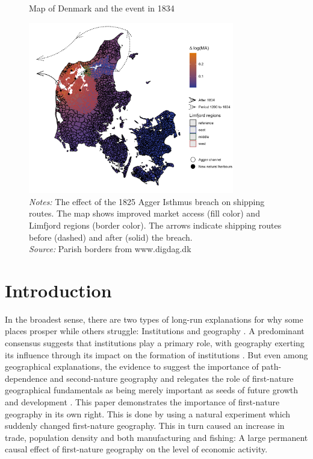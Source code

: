 \documentclass[11pt]{article}
\begin{document}
\begin{figure}[h]
\centering
\caption{Map of Denmark and the event in 1834}
\includegraphics[width=0.8\textwidth]{Plots/Map_manual_edits.png}
\parbox{0.9\textwidth}{
\caption*{\footnotesize \textit{Notes:} The effect of the 1825 Agger Isthmus breach on shipping routes. The map shows improved market access (fill color) and Limfjord regions (border color). The arrows indicate shipping routes before (dashed) and after (solid) the breach. \\ \textit{Source:} Parish borders from www.digdag.dk}
}
\label{fig:main_map}
\end{figure}

\section{Introduction}
In the broadest sense, there are two types of long-run explanations for why some places prosper while others struggle: Institutions \citep{rodrik2004institutions} and geography \citep{Henderson2018satelite}. A predominant consensus suggests that institutions play a primary role, with geography exerting its influence through its impact on the formation of institutions \citep{Acemoglu2001, rodrik2004institutions, Easterly2003, Ketterer2018}. But even among geographical explanations, the evidence to suggest the importance of path-dependence and second-nature geography \citep{Krugman1991, Bleakley2012, Ager2020a} and relegates the role of first-nature geographical fundamentals as being merely important as seeds of future growth and development \citep{Davis2002, Bosker2017, Allen2023}. This paper demonstrates the importance of first-nature geography in its own right. This is done by using a natural experiment which suddenly changed first-nature geography. This in turn caused an increase in trade, population density and both manufacturing and fishing: A large permanent causal effect of first-nature geography on the level of economic activity.  
\end{document}
